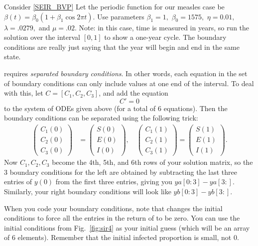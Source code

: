 \begin{problem}
Consider \eqref{SEIR_BVP}
Let the periodic function for our measles case be $\beta(t) = \beta_0(1 + \beta_1 \cos{2\pi t})$.
Use parameters $\beta_1 = 1,$ $\beta_0 = 1575,$ $\eta = 0.01,$ $\lambda = .0279,$ and $\mu = .02.$
Note: in this case, time is measured in years, so run the solution over the interval $\left[0, 1\right]$ to show a one-year cycle.
The boundary conditions are really just saying that the year will begin and end in the same state.

 requires \emph{separated boundary conditions}.
In other words, each equation in the set of boundary conditions can only include values at one end of the interval.
To deal with this, let $C = [C_1, C_2, C_3]$, and add the equation
\[C' = 0\]
to the system of ODEs given above (for a total of 6 equations).
Then the boundary conditions can be separated using the following trick:
\begin{align*}
	\begin{pmatrix}C_1(0) \\C_2(0) \\ C_3(0) \end{pmatrix} &= \begin{pmatrix}S(0) \\E(0) \\ I(0) \end{pmatrix}, \quad 	\begin{pmatrix}C_1(1) \\C_2(1) \\ C_3(1) \end{pmatrix} = \begin{pmatrix}S(1) \\E(1) \\ I(1) \end{pmatrix}.
\end{align*}
Now $C_1,C_2,C_3$ become the 4th, 5th, and 6th rows of your solution matrix, so the 3 boundary conditions for the left are obtained by subtracting the last three entries of $y(0)$ from the first three entries, giving you $ya[0:3]-ya[3:]$. Similarly, your right boundary conditions will look like $yb[0:3]-yb[3:]$.

When you code your boundary conditions, note that  changes the initial conditions to force all the entries in the return of  to be zero.
You can use the initial conditions from Fig.~\ref{fig:sir4} as your initial guess (which will be an array of 6 elements). Remember that the initial infected proportion is small, not 0.

\label{prob:sir_measles}
\end{problem} 


